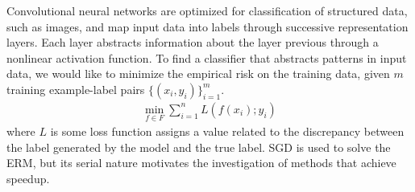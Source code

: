 Convolutional neural networks are optimized for classification of structured data, such as images, and map input data into labels through successive representation layers.  Each layer abstracts information about the layer previous through a nonlinear activation function.  
To find a classifier that abstracts patterns in input data, we would like to minimize the empirical risk on the training data, given $m$ training example-label pairs $\{(x_i,y_i)\}_{i=1}^m$.
\begin{align*}
\min_{f\in F}\sum_{i=1}^n L(f(x_i);y_i)
\end{align*}
where $L$ is some loss function assigns a value related to the discrepancy between the label generated by the model and the true label.  SGD is used to solve the ERM, but its serial nature motivates the investigation of methods that achieve speedup.
 
